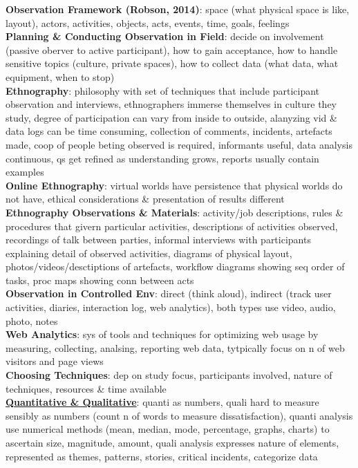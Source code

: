 \documentclass[a4paper]{article}
\begin{document}
\begin{multicols}{3}
        \textbf{Observation Framework (Robson, 2014)}: space (what physical space is like, layout), actors, activities, objects, acts, events, time, goals, feelings\\
        \textbf{Planning \& Conducting Observation in Field}: decide on involvement (passive oberver to active participant), how to gain acceptance, how to handle sensitive topics (culture, private spaces), how to collect data (what data, what equipment, when to stop)\\
        \textbf{Ethnography}: philosophy with set of techniques that include participant observation and interviews, ethnographers immerse themselves in culture they study, degree of participation can vary from inside to outside, alanyzing vid \& data logs can be time consuming, collection of comments, incidents, artefacts made, coop of people beting observed is required, informants useful, data analysis continuous, qs get refined as understanding grows, reports usually contain examples\\
        \textbf{Online Ethnography}: virtual worlds have persistence that physical worlds do not have, ethical considerations \& presentation of results different\\
        \textbf{Ethnography Observations \& Materials}: activity/job descriptions, rules \& procedures that givern particular activities, descriptions of activities observed, recordings of talk between parties, informal interviews with participants explaining detail of observed activities, diagrams of physical layout, photos/videos/desctiptions of artefacts, workflow diagrams showing seq order of tasks, proc maps showing conn between acts\\
        \textbf{Observation in Controlled Env}: direct (think aloud), indirect (track user activities, diaries, interaction log, web analytics), both types use video, audio, photo, notes\\
        \textbf{Web Analytics}: sys of tools and techniques for optimizing web usage by measuring, collecting, analsing, reporting web data, tytpically focus on n of web visitors and page views\\
        \textbf{Choosing Techniques}: dep on study focus, participants involved, nature of techniques, resources \& time available\\
        \underline{\textbf{Quantitative \& Qualitative}}: quanti as numbers, quali hard to measure sensibly as numbers (count n of words to measure dissatisfaction), quanti analysis use numerical methods (mean, median, mode, percentage, graphs, charts) to ascertain size, magnitude, amount, quali analysis expresses nature of elements, represented as themes, patterns, stories, critical incidents, categorize data\\

\end{multicols}
\end{document}
